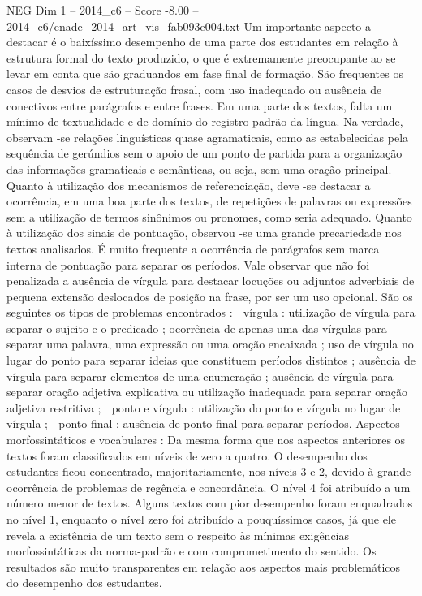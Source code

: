 \begin{textsample}{NEG Dim 1 – 2014\_c6 – Score -8.00 – 2014\_c6/enade\_2014\_art\_vis\_fab093e004.txt}
Um importante aspecto a destacar é o baixíssimo desempenho de uma parte dos estudantes em relação à estrutura formal do texto produzido, o que é extremamente preocupante ao se levar em conta que são graduandos em fase final de formação.
São frequentes os casos de desvios de estruturação frasal, com uso inadequado ou ausência de conectivos entre parágrafos e entre frases.
Em uma parte dos textos, falta um mínimo de textualidade e de domínio do registro padrão da língua.
Na verdade, observam -se relações linguísticas quase agramaticais, como as estabelecidas pela sequência de gerúndios sem o apoio de um ponto de partida para a organização das informações gramaticais e semânticas, ou seja, sem uma oração principal.
Quanto à utilização dos mecanismos de referenciação, deve -se destacar a ocorrência, em uma boa parte dos textos, de repetições de palavras ou expressões sem a utilização de termos sinônimos ou pronomes, como seria adequado.
Quanto à utilização dos sinais de pontuação, observou -se uma grande precariedade nos textos analisados.
É muito frequente a ocorrência de parágrafos sem marca interna de pontuação para separar os períodos.
Vale observar que não foi penalizada a ausência de vírgula para destacar locuções ou adjuntos adverbiais de pequena extensão deslocados de posição na frase, por ser um uso opcional.
São os seguintes os tipos de problemas encontrados :  vírgula : utilização de vírgula para separar o sujeito e o predicado ; ocorrência de apenas uma das vírgulas para separar uma palavra, uma expressão ou uma oração encaixada ; uso de vírgula no lugar do ponto para separar ideias que constituem períodos distintos ; ausência de vírgula para separar elementos de uma enumeração ; ausência de vírgula para separar oração adjetiva explicativa ou utilização inadequada para separar oração adjetiva restritiva ;  ponto e vírgula : utilização do ponto e vírgula no lugar de vírgula ;  ponto final : ausência de ponto final para separar períodos.
Aspectos morfossintáticos e vocabulares : Da mesma forma que nos aspectos anteriores os textos foram classificados em níveis de zero a quatro.
O desempenho dos estudantes ficou concentrado, majoritariamente, nos níveis 3 e 2, devido à grande ocorrência de problemas de regência e concordância.
O nível 4 foi atribuído a um número menor de textos.
Alguns textos com pior desempenho foram enquadrados no nível 1, enquanto o nível zero foi atribuído a pouquíssimos casos, já que ele revela a existência de um texto sem o respeito às mínimas exigências morfossintáticas da norma-padrão e com comprometimento do sentido.
Os resultados são muito transparentes em relação aos aspectos mais problemáticos do desempenho dos estudantes.

\end{textsample}
